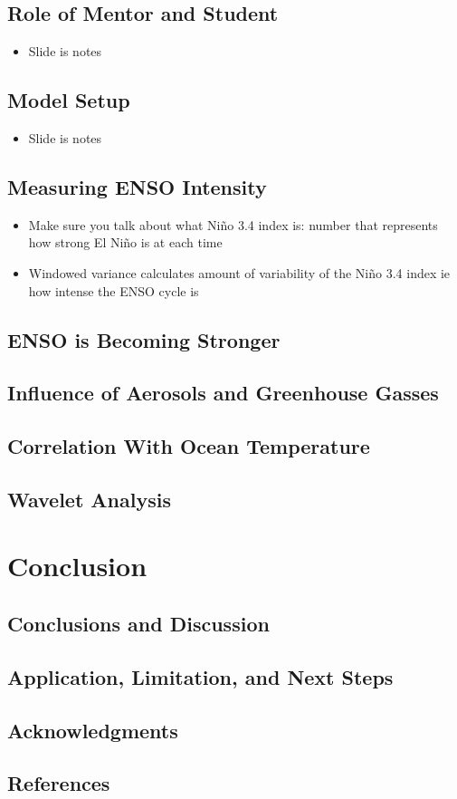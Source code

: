 \documentclass[little]{basic}
\begin{document}
\subsection*{Role of Mentor and Student}
\label{sec:org1650fef}
\begin{itemize}
\item Slide is notes
\end{itemize}
\subsection*{Model Setup}
\label{sec:orgb994e4d}
\begin{itemize}
\item Slide is notes
\end{itemize}
\subsection*{Measuring ENSO Intensity}
\label{sec:org40dcc5e}
\begin{itemize}
\item Make sure you talk about what Niño 3.4 index is: number that represents how strong El Niño is at each time
\item Windowed variance calculates amount of variability of the Niño 3.4 index ie how intense the ENSO cycle is
\end{itemize}
\subsection*{ENSO is Becoming Stronger}
\label{sec:orgcdec18c}
\subsection*{Influence of Aerosols and Greenhouse Gasses}
\label{sec:org3b80de0}
\subsection*{Correlation With Ocean Temperature}
\label{sec:org0736ced}
\subsection*{Wavelet Analysis}
\label{sec:org2f294d1}
\section{Conclusion}
\label{sec:orgd03482b}
\subsection*{Conclusions and Discussion}
\label{sec:org4e13d7c}
\subsection*{Application, Limitation, and Next Steps}
\label{sec:org0486ffb}
\subsection*{Acknowledgments}
\label{sec:org4ae1490}
\subsection*{References}
\label{sec:orgcee0089}
\end{document}
